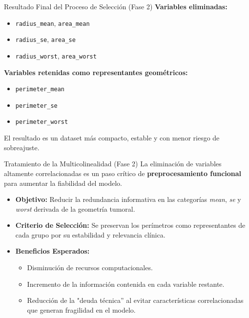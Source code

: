 \documentclass{beamer}
\begin{document}
	
	\begin{frame}{Resultado Final del Proceso de Selección (Fase 2)}
		\textbf{Variables eliminadas:}
		
		\begin{itemize}
			\item \texttt{radius\_mean}, \texttt{area\_mean}
			\item \texttt{radius\_se}, \texttt{area\_se}
			\item \texttt{radius\_worst}, \texttt{area\_worst}
		\end{itemize}
		
		\textbf{Variables retenidas como representantes geométricos:}
		
		\begin{itemize}
			\item \texttt{perimeter\_mean}
			\item \texttt{perimeter\_se}
			\item \texttt{perimeter\_worst}
		\end{itemize}
		
		El resultado es un dataset más compacto, estable y con menor riesgo de sobreajuste.
	\end{frame}
	
	\begin{frame}{Tratamiento de la Multicolinealidad (Fase 2)}
		La eliminación de variables altamente correlacionadas es un paso crítico de \textbf{preprocesamiento funcional} para aumentar la fiabilidad del modelo.
		
		\begin{itemize}
			\item<2-> \textbf{Objetivo:} Reducir la redundancia informativa en las categorías \textit{mean}, \textit{se} y \textit{worst} derivada de la geometría tumoral.
			\item<3-> \textbf{Criterio de Selección:} Se preservan los perímetros como representantes de cada grupo por su estabilidad y relevancia clínica.
			\item<4-> \textbf{Beneficios Esperados:} 
			\begin{itemize}
				\item Disminución de recursos computacionales.
				\item Incremento de la información contenida en cada variable restante.
				\item Reducción de la "deuda técnica'' al evitar características correlacionadas que generan fragilidad en el modelo.
			\end{itemize}
		\end{itemize}
	\end{frame}
	
\end{document}
